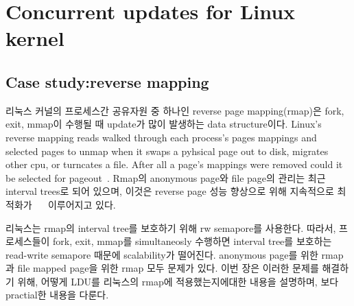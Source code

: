 \section{Concurrent updates for Linux kernel}

\subsection{Case study:reverse mapping}

리눅스 커널의 프로세스간 공유자원 중 하나인 reverse page mapping(rmap)은 fork, exit, mmap이 수행될 때
update가 많이 발생하는 data structure이다.
Linux's reverse mapping reads walked through each process’s pages mappings and
selected pages to unmap when it swaps a pyhsical page out to disk, migrates
other cpu, or turncates a file.
After all a page’s mappings were removed could it be selected for
pageout~\cite{OBJMAPOLS}.
Rmap의 anonymous page와 file page의 관리는 최근 interval trees로 되어 있으며, 이것은 reverse page
성능 향상으로 위해 지속적으로 최적화가 ~\cite{CorbetLWNRMAP}~\cite{CorbetLWNANON} 이루어지고 있다. 

리눅스는 rmap의 interval tree를 보호하기 위해 rw semapore를 사용한다. 
따라서, 프로세스들이 fork, exit, mmap를 simultaneosly 수행하면 interval tree를 보호하는
read-write semapore 때문에 scalability가 떨어진다.
anonymous page를 위한 rmap과 file mapped page을 위한 rmap 모두 문제가 있다.
이번 장은 이러한 문제를 해결하기 위해, 어떻게 LDU를 리눅스의 rmap에 적용했는지에대한 내용을 설명하며, 보다 practial한 내용을
다룬다.



